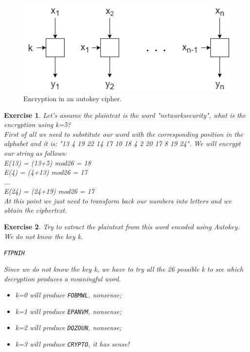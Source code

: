 \documentclass[a4paper, 12pt]{report}
\newtheorem{exercise}{\textbf{Exercise}}
\begin{document}
\begin{figure}[H]
	\centering
	\includegraphics[scale=0.6]{images/Lec4/encautokey.png}
	\caption{Encryption in an autokey cipher.}
	\label{fig:encautokey}
\end{figure}

\begin{exercise}
	Let's assume the plaintext is the word "networksecurity", what is the encryption using k=5?\\
	First of all we need to substitute our word with the corresponding position in the alphabet and it is: "13 4 19 22 14 17 10 18 4 2 20 17 8 19 24". We will encrypt our string as follows:\\
	
	E(13) = (13+5) mod26 = 18\\
	E(4) = (4+13) mod26 = 17\\
	...\\
	E(24) = (24+19) mod26 = 17\\
	
	At this point we just need to transform back our numbers into letters and we obtain the ciphertext.
\end{exercise}

\begin{exercise}
	Try to extract the plaintext from this word encoded using Autokey. We do not know the key k.
	\begin{center}
		\texttt{FTPNIH}
	\end{center}

	Since we do not know the key k, we have to try all the 26 possible k to see which decryption produces a meaningful word.
	
	\begin{itemize}
		\item k=0 will produce \texttt{FOBMWL}, nonsense;
		\item k=1 will produce \texttt{EPANVM}, nonsense;
		\item k=2 will produce \texttt{DQZOUN}, nonsense;
		\item k=3 will produce \texttt{CRYPTO}, it has sense!
	\end{itemize}
\end{exercise}
\end{document}
